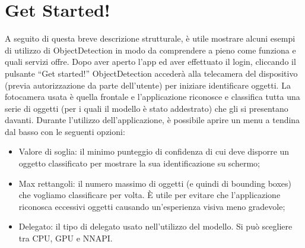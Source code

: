 \section{Get Started!}
A seguito di questa breve descrizione strutturale, è utile mostrare alcuni esempi di utilizzo di ObjectDetection in modo da comprendere a pieno come
funziona e quali servizi offre.
Dopo aver aperto l’app ed aver effettuato il login, cliccando il pulsante “Get started!” ObjectDetection accederà alla telecamera del dispositivo (previa autorizzazione da parte dell'utente) per iniziare 
identificare oggetti.
La fotocamera usata è quella frontale e l’applicazione riconosce e classifica tutta una serie di oggetti (per i quali il modello è stato addestrato) che gli si presentano davanti.
Durante l’utilizzo dell’applicazione, è possibile aprire un menu a tendina dal basso con le seguenti opzioni:
\begin{itemize}
    \item Valore di soglia: il minimo punteggio di confidenza di cui deve disporre un oggetto classificato per mostrare la sua identificazione su schermo;
    \item Max rettangoli: il numero massimo di oggetti (e quindi di bounding boxes) che vogliamo classificare per volta. È utile per evitare che
    l’applicazione riconosca eccessivi oggetti causando un’esperienza visiva meno gradevole;
    \item Delegato: il tipo di delegato usato nell’utilizzo del modello. Si può scegliere tra CPU, GPU e NNAPI.
\end{itemize}

